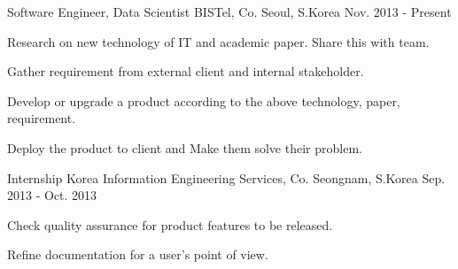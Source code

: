 

\begin{cventries}

  \cventry
    {Software Engineer, Data Scientist} %
    {BISTel, Co.} %
    {Seoul, S.Korea} %
    {Nov. 2013 - Present} %
    {
      \begin{cvitems} %
        \item {Research on new technology of IT and academic paper. Share this with team.}
        \item {Gather requirement from external client and internal stakeholder.}
        \item {Develop or upgrade a product according to the above technology, paper, requirement.}
        \item {Deploy the product to client and Make them solve their problem.}
      \end{cvitems}
    }

  \cventry
    {Internship} %
    {Korea Information Engineering Services, Co.} %
    {Seongnam, S.Korea} %
    {Sep. 2013 - Oct. 2013} %
    {
      \begin{cvitems} %
        \item {Check quality assurance for product features to be released.}
        \item {Refine documentation for a user's point of view.}
      \end{cvitems}
    }

\end{cventries}
